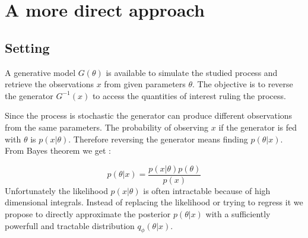 
\chapter{A more direct approach}
\label{chap:direct_approach}

\ifpdf
    \graphicspath{{Chapter3/Figs/Raster/}{Chapter3/Figs/PDF/}{Chapter3/Figs/}}
\else
    \graphicspath{{Chapter3/Figs/Vector/}{Chapter3/Figs/}}
\fi



\section{Setting} %
\label{sec:setting}


A generative model $G(\theta)$ is available to simulate the studied process and retrieve the observations $x$ from given parameters $\theta$.
The objective is to reverse the generator $G^{-1}(x)$ to access the quantities of interest ruling the process.

Since the process is stochastic the generator can produce different observations from the same parameters.
The probability of observing $x$ if the generator is fed with $\theta$ is $p(x | \theta)$.
Therefore reversing the generator means finding $p(\theta | x)$.
From Bayes theorem we get :

\begin{equation}
    p(\theta | x) = \frac{p(x | \theta) p(\theta) }{p(x)}
\end{equation}
Unfortunately the likelihood $p(x | \theta)$ is often intractable because of high dimensional integrals.
Instead of replacing the likelihood or trying to regress it we propose to directly approximate the posterior $p(\theta | x)$ with a sufficiently powerfull and tractable distribution $q_\phi(\theta | x)$.


